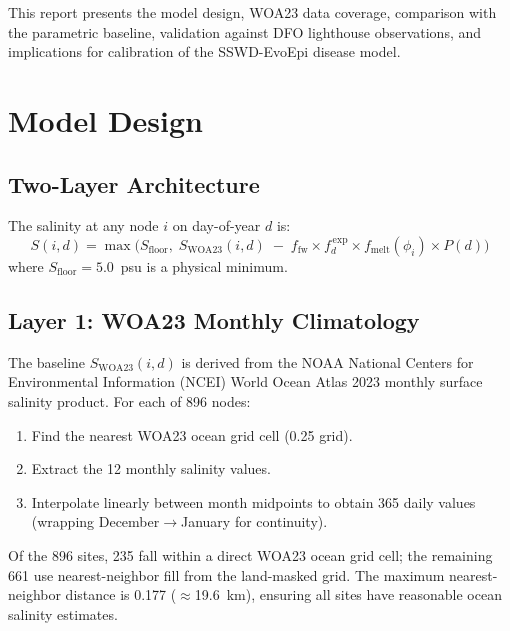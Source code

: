 \documentclass[11pt,letterpaper]{article}
\begin{document}
\noindent This report presents the model design, WOA23 data coverage,
comparison with the parametric baseline, validation against DFO
lighthouse observations, and implications for calibration of the
SSWD-EvoEpi disease model.

\section{Model Design}

\subsection{Two-Layer Architecture}

The salinity at any node $i$ on day-of-year $d$ is:
\begin{equation}
    S(i, d) = \max\!\bigl(S_\mathrm{floor},\;
    S_\mathrm{WOA23}(i, d) \;-\;
    f_\mathrm{fw} \times f_d^{\,\mathrm{exp}} \times f_\mathrm{melt}(\phi_i)
    \times P(d)\bigr)
    \label{eq:model}
\end{equation}
where $S_\mathrm{floor} = 5.0$~psu is a physical minimum.

\subsection{Layer 1: WOA23 Monthly Climatology}

The baseline $S_\mathrm{WOA23}(i, d)$ is derived from the NOAA National
Centers for Environmental Information (NCEI) World Ocean Atlas 2023
monthly surface salinity product. For each of 896 nodes:
\begin{enumerate}[nosep]
    \item Find the nearest WOA23 ocean grid cell (0.25\textdegree{} grid).
    \item Extract the 12 monthly salinity values.
    \item Interpolate linearly between month midpoints to obtain 365 daily
          values (wrapping December$\rightarrow$January for continuity).
\end{enumerate}

Of the 896 sites, 235 fall within a direct WOA23 ocean grid cell;
the remaining 661 use nearest-neighbor fill from the land-masked grid.
The maximum nearest-neighbor distance is 0.177\textdegree{}
($\approx$19.6~km), ensuring all sites have reasonable ocean salinity
estimates.
\end{document}
